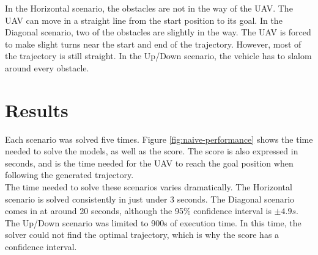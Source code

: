 In the Horizontal scenario, the obstacles are not in the way of the UAV. The UAV can move in a straight line from the start position to its goal. In the Diagonal scenario, two of the obstacles are slightly in the way. The UAV is forced to make slight turns near the start and end of the trajectory. However, most of the trajectory is still straight. In the Up/Down scenario, the vehicle has to slalom around every obstacle.\\
\section{Results}
\label{subsec:naive-results}

Each scenario was solved five times. Figure \ref{fig:naive-performance} shows the time needed to solve the models, as well as the score. The score is also expressed in seconds, and is the time needed for the UAV to reach the goal position when following the generated trajectory. \\
The time needed to solve these scenarios varies dramatically. The Horizontal scenario is solved consistently in just under 3 seconds. The Diagonal scenario comes in at around 20 seconds, although the 95\% confidence interval is $\pm 4.9s$. The Up/Down scenario was limited to 900s of execution time. In this time, the solver could not find the optimal trajectory, which is why the score has a confidence interval.
